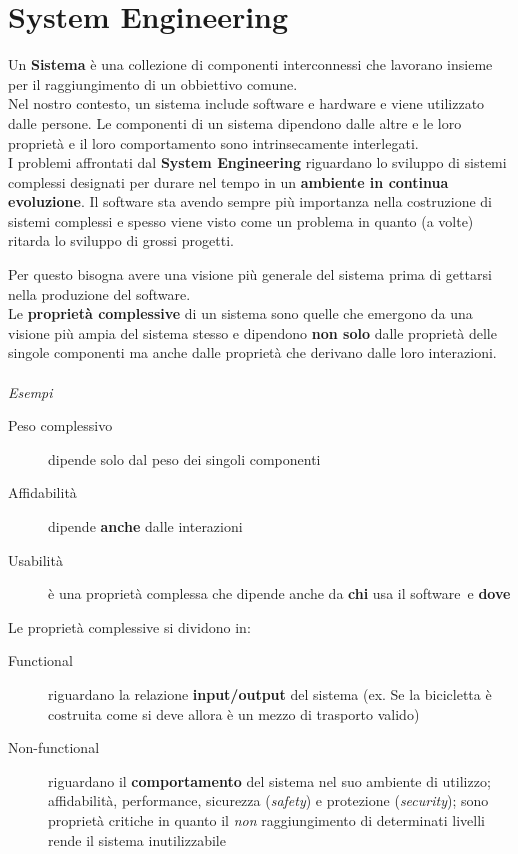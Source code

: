 \chapter{System Engineering}

Un \textbf{Sistema} \`e una collezione di componenti interconnessi
che lavorano insieme per il raggiungimento di un obbiettivo comune.\\
Nel nostro contesto, un sistema include software e hardware e viene
utilizzato dalle persone. Le componenti di un sistema dipendono dalle
altre e le loro propriet\`a e il loro comportamento sono intrinsecamente
interlegati.\\

I problemi affrontati dal \textbf{System Engineering} riguardano
lo sviluppo di sistemi complessi designati per durare nel tempo
in un \textbf{ambiente in continua evoluzione}. Il software sta
avendo sempre pi\`u importanza nella costruzione di sistemi complessi
e spesso viene visto come un problema in quanto (a volte) ritarda
lo sviluppo di grossi progetti.

Per questo bisogna avere una visione pi\`u generale del sistema
prima di gettarsi nella produzione del software.\\

Le \textbf{propriet\`a complessive} di un sistema sono quelle che
emergono da una visione pi\`u ampia del sistema stesso e dipendono
\textbf{non solo} dalle propriet\`a delle singole componenti ma anche
dalle propriet\`a che derivano dalle loro interazioni.\\~\\

\textit{Esempi}
\begin{description}
    \item[Peso complessivo] dipende solo dal peso
            dei singoli componenti
    \item[Affidabilit\`a] dipende \textbf{anche} dalle interazioni
    \item[Usabilit\`a] \`e una propriet\`a complessa che dipende
            anche da \textbf{chi} usa il software~e \textbf{dove}
\end{description}
\newpage

Le propriet\`a complessive si dividono in:
\begin{description}
    \item[Functional] riguardano la relazione \textbf{input/output}
            del sistema (ex. Se la bicicletta \`e costruita come si deve
            allora \`e un mezzo di trasporto valido)
    \item[Non-functional] riguardano il \textbf{comportamento} del sistema
            nel suo ambiente di utilizzo; affidabilit\`a, performance,
            sicurezza (\textit{safety}) e protezione (\textit{security});
            sono propriet\`a critiche in quanto il \textit{non}
            raggiungimento di determinati livelli rende il sistema
            inutilizzabile
\end{description}

